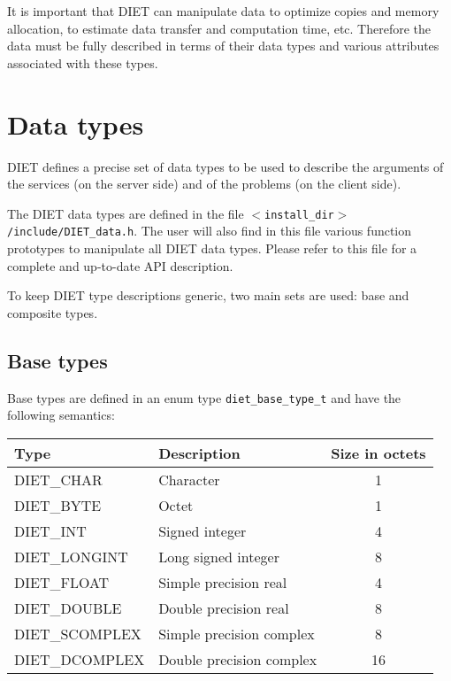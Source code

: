 It is important that DIET can manipulate data to optimize copies and
memory allocation, to estimate data transfer and computation time,
etc. Therefore the data must be fully described in terms of their data 
types and various attributes associated with these types.

\section{Data types}
\label{sec:types}

DIET defines a precise set of data types to be used to describe the arguments of
the services (on the server side) and of the problems (on the client side).

The DIET data types are defined in the file
\texttt{$<$install\_dir$>$/include/DIET\_data.h}. The user will also find in
this file various function prototypes to manipulate all DIET data types. Please
refer to this file for a complete and up-to-date API description.

To keep DIET type descriptions generic, two main sets are used: base and
composite types.

\subsection{Base types}
\label{ssec:base}

Base types are defined in an enum type \texttt{diet\_base\_type\_t} and have the
following semantics:
\begin{center}
\footnotesize
\begin{tabular}{|l|l|c|}
\hline
\textbf{Type}&\textbf{Description}&\textbf{Size in octets}\\
\hline
\textsf{DIET\_CHAR}     & Character                &  1\\
\textsf{DIET\_BYTE}     & Octet                    &  1\\
\textsf{DIET\_INT}      & Signed integer           &  4\\
\textsf{DIET\_LONGINT}  & Long signed integer      &  8\\
\textsf{DIET\_FLOAT}    & Simple precision real    &  4\\
\textsf{DIET\_DOUBLE}   & Double precision real    &  8\\
\hline\hline
\textsf{DIET\_SCOMPLEX} & Simple precision complex &  8\\
\textsf{DIET\_DCOMPLEX} & Double precision complex & 16\\
\hline
\end{tabular}
\end{center}

